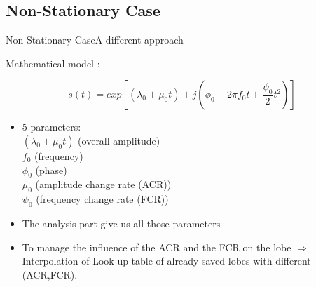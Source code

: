 \documentclass{bredelebeamer}
\begin{document}
\subsection{Non-Stationary Case}
\begin{frame}{Non-Stationary Case}{A different approach}

\begin{block}{Mathematical model  :}

\begin{equation}
s(t) = exp[(\lambda_0 + \mu_0 t) + j(\phi_0 + 2\pi f_0 t + \frac{\psi_0}2 t^2 )]
\end{equation}
\end{block}
\begin{itemize}
\item 5 parameters: \\ $(\lambda_0 + \mu_0 t)$ (overall amplitude)\\ $f_0$ (frequency)\\ $\phi_0$ (phase) \\ $ \mu_0$ (amplitude change rate (ACR))\\ $\psi_0$ (frequency change rate (FCR))
\item The analysis part give us all those parameters
\item To manage the influence of the ACR and the FCR on the lobe $\Rightarrow$ Interpolation of Look-up table of already saved lobes with different (ACR,FCR).
\end{itemize}

\end{frame}
\end{document}
